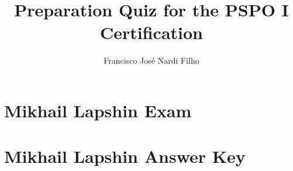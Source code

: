 \documentclass[a4paper,11pt]{article}
\begin{document}
\title{\bf{Preparation Quiz for the PSPO I Certification}}
\author{Francisco Jos\'e Nardi Filho}
\date{}
\maketitle


\section{Mikhail Lapshin Exam}

\newpage
\section{Mikhail Lapshin Answer Key}

\end{document}
